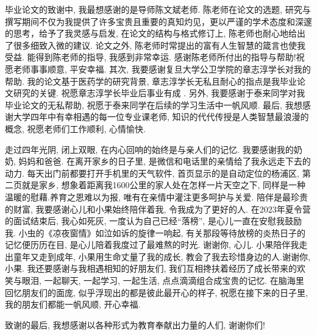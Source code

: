 \documentclass[a4paper,punct=banjiao,twoside]{ctexrep}
\theoremstyle{plain}
\theoremstyle{definition}
\theoremstyle{remark}
\begin{document}
毕业论文的致谢中, 我最想感谢的是导师陈文斌老师. 陈老师在论文的选题, 研究与撰写期间不仅为我提供了许多宝贵且重要的真知灼见，更以严谨的学术态度和深邃的思考，给予了我灵感与启发,
在论文的结构与格式修订上, 陈老师也耐心地给出了很多细致入微的建议.
论文之外, 陈老师时常提出的富有人生智慧的箴言也使我受益. 能得到陈老师的指导, 我感到非常幸运. 感谢陈老师所付出的指导与帮助!祝愿老师事事顺意, 平安幸福.
其次, 我要感谢复旦大学公卫学院的章志淳学长对我的帮助. 我的论文基于医药学的研究背景, 章志淳学长无私且耐心的指点是我毕业论文研究的关键. 祝愿章志淳学长毕业后事业有成 .
另外, 我要感谢于泰来同学对我毕业论文的无私帮助, 祝愿于泰来同学在后续的学习生活中一帆风顺. 
最后, 我想感谢大学四年中有幸相遇的每一位专业课老师, 知识的代代传授是人类智慧最浪漫的概念, 祝愿老师们工作顺利, 心情愉快. 

走过四年光阴, 闭上双眼, 在内心回响的始终是与亲人们的记忆. 我要感谢我的奶奶, 妈妈和爸爸. 在离开家乡的日子里, 是微信和电话里的亲情给了我永远走下去的动力. 
每天出门前都要打开手机里的天气软件, 首页显示的是自动定位的杨浦区, 第二页就是家乡, 想象着距离我1600公里的家人处在怎样一片天空之下, 同样是一种温暖的慰藉.养育之恩难以为报, 唯有在亲情中灌注更多呵护与关爱. 
陪伴是最珍贵的财富, 我要感谢心儿和小果始终陪伴着我, 令我成为了更好的人. 在2023年夏令营的面试结束后, 我心如死灰, 一度认为自己已经``落榜'', 是心儿一直在安慰我鼓励我. 
小虫的《凉夜窗情》如泣如诉的旋律一响起, 有关那段等待放榜的炎热日子的记忆便历历在目, 是心儿陪着我度过了最难熬的时光. 谢谢你, 心儿. 
小果陪伴我走出童年又走到成年, 小果用生命丈量了我的成长, 教会了我去珍惜身边的人.谢谢你, 小果. 
我还要感谢与我相遇相知的好朋友们, 我们互相搀扶着经历了成长带来的欢笑与眼泪, 一起聊天, 一起学习, 一起生活, 点点滴滴组合成宝贵的记忆. 在脑海里回忆朋友们的面庞, 似乎浮现出的都是彼此最开心的样子, 
祝愿在接下来的日子里, 我的朋友们都能一帆风顺, 开心幸福.

致谢的最后, 我想感谢以各种形式为教育奉献出力量的人们, 谢谢你们!
\end{document}
